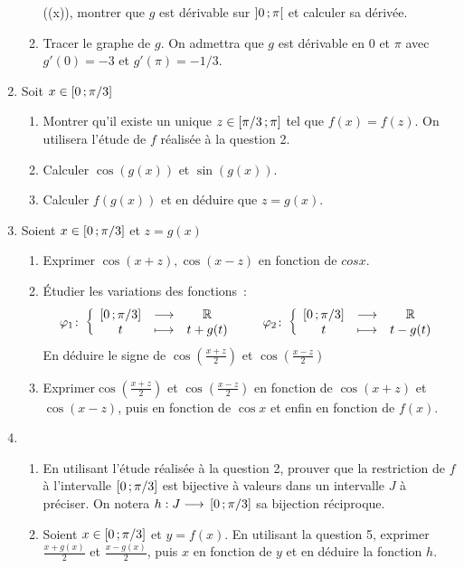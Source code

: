 \begin{exercice}[Problème]
\begin{enumerate}
\begin{enumerate}
        \arccos(\psi(x))\), montrer que \(g\) est dérivable sur 
        \(\left] 0 \, ; {} \pi \right[\) et calculer sa dérivée.
      \item Tracer le graphe de \(g\). On admettra que \(g\) est dérivable en 
        \(0\) et \(\pi\) avec \(g'(0) = -3\) et \(g'(\pi) = -1/3\).
    \end{enumerate}
  \item Soit \(x \in \left[ 0 \, ; {} \pi/3 \right]\)
    \begin{enumerate}
      \item Montrer qu'il existe un unique \(z \in \left[ \pi/3 \, ; {} \pi \right]\) 
        tel que \(f(x) = f(z)\). On utilisera l'étude de \(f\) réalisée à la 
        question 2.
      \item Calculer \(\cos(g(x))\) et \(\sin(g(x))\).
      \item Calculer \(f(g(x))\) et en déduire que \(z = g(x)\).
    \end{enumerate}
  \item Soient \(x \in \left[ 0 \, ; {} \pi/3 \right]\) et \(z = g(x)\)
    \begin{enumerate}
      \item Exprimer \(\cos(x+z), \cos(x-z)\) en fonction de \(cos x\).
      \item Étudier les variations des fonctions~:
        \[ \varphi_1\colon\left\{\begin{array}{ccc}\left[ 0 \, ; {} \pi/3 \right] & \longrightarrow &\mathbb{R}\\t & \longmapsto & t+g(t)\end{array}\right. \qquad 
        \varphi_2\colon\left\{\begin{array}{ccc}\left[ 0 \, ; {} \pi/3 \right] & \longrightarrow &\mathbb{R}\\t & \longmapsto & t-g(t)\end{array}\right. \]
        En déduire le signe de \(\cos\left(\frac{x+z}{2}\right)\) et 
        \(\cos\left(\frac{x-z}{2}\right)\)
      \item Exprimer\(\cos\left(\frac{x+z}{2}\right)\) et 
        \(\cos\left(\frac{x-z}{2}\right)\) en fonction de \(\cos(x+z)\) et 
        \(\cos(x-z)\), puis en fonction de \(\cos x\) et enfin en fonction de 
        \(f(x)\).
    \end{enumerate}
  \item \begin{enumerate}
      \item En utilisant l'étude réalisée à la question 2, prouver que la 
        restriction de \(f\) à l'intervalle \(\left[ 0 \, ; {} \pi/3 \right]\) est 
        bijective à valeurs dans un intervalle \(J\) à préciser. On notera 
        \(h:J \longrightarrow{} \left[ 0 \, ; {} \pi/3 \right]\) sa bijection réciproque.
      \item Soient \(x \in \left[ 0 \, ; {} \pi/3 \right]\) et \(y=f(x)\). En 
        utilisant la question 5, exprimer \(\frac{x+g(x)}{2}\) et 
        \(\frac{x-g(x)}{2}\), puis \(x\) en fonction de \(y\) et en déduire la 
        fonction \(h\).
  \end{enumerate}
\end{enumerate}
\end{exercice}

